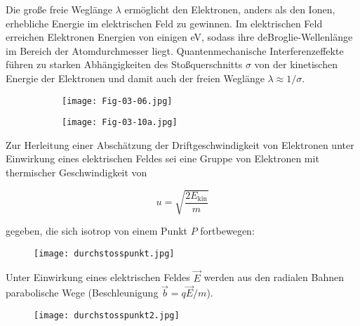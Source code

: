 Die große freie Weglänge $\lambda$ ermöglicht den Elektronen, anders als den Ionen, erhebliche
Energie im elektrischen Feld zu gewinnen. Im elektrischen Feld erreichen Elektronen Energien von
einigen eV, sodass ihre deBroglie-Wellenlänge im Bereich der Atomdurchmesser liegt.
Quantenmechanische Interferenzeffekte führen zu starken Abhängigkeiten des Stoßquerschnitts $\sigma$
von der kinetischen Energie der Elektronen und damit auch der freien Weglänge $\lambda\approx
1/\sigma$.


\begin{figure}[htbp]
	\begin{minipage}[b]{0.65\textwidth}
		\begin{figure}[H]
		\centering
		\texttt{[image: Fig-03-06.jpg]}
		\end{figure}
	\end{minipage}
	\hspace{0.5cm}
	\begin{minipage}[b]{0.25\textwidth}
		\begin{figure}[H]
		\centering
		\texttt{[image: Fig-03-10a.jpg]}
		\end{figure}
	\end{minipage} 
\end{figure}

Zur Herleitung einer Abschätzung der Driftgeschwindigkeit von Elektronen unter Einwirkung eines
elektrischen Feldes sei eine Gruppe von Elektronen mit thermischer Geschwindigkeit von

\[u=\sqrt{\frac{2E_{\text{kin}}}{m}}  \]

gegeben, die sich isotrop von einem Punkt $P$ fortbewegen:

\begin{figure}[H]
	\centering
	\texttt{[image: durchstosspunkt.jpg]}
\end{figure}

Unter Einwirkung eines elektrischen Feldes $\vec{E}$ werden aus den radialen Bahnen parabolische
Wege (Beschleunigung $\vec{b}=q\vec{E}/m$).

\begin{figure}[H]
	\centering
	\texttt{[image: durchstosspunkt2.jpg]}
\end{figure}

